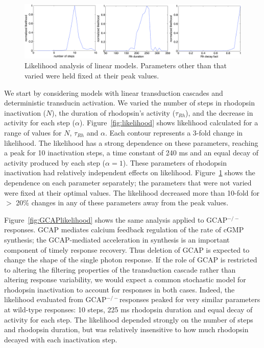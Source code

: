 \documentclass[12pt]{article}
\def\GCAPKO{GCAP$^{-/-}$}
\begin{document}
\begin{figure}[h]
\begin{center}
\includegraphics[width=6in]{likelihoodcuts.pdf}
\caption{Likelihood analysis of linear models.  Parameters other than that varied were held fixed at their peak values.}
\label{fig:likelihoodcuts}
\end{center}
\end{figure}

We start by considering models with linear transduction cascades and deterministic transducin activation.  We varied the number of steps in rhodopsin inactivation ($N$), the duration of rhodopsin's activity ($\tau_{Rh}$), and the decrease in activity for each step ($\alpha$).  Figure~\ref{fig:likelihood} shows likelihood calculated for a range of values for $N$, $\tau_{Rh}$ and $\alpha$.  Each contour represents a 3-fold change in likelihood.  The likelihood has a strong dependence on these parameters, reaching a peak for 10 inactivation steps, a time constant of 240 ms and an equal decay of activity produced by each step ($\alpha = 1$).  These parameters of rhodopsin inactivation had relatively independent effects on likelihood.  Figure~\ref{fig:likelihoodcuts} shows the dependence on each parameter separately; the parameters that were not varied were fixed at their optimal values.  The likelihood decreased more than 10-fold for $>$ 20\% changes in any of these parameters away from the peak values.

Figure~\ref{fig:GCAPlikelihood} shows the same analysis applied to \GCAPKO responses.  GCAP mediates calcium feedback regulation of the rate of cGMP synthesis; the GCAP-mediated acceleration in synthesis is an important component of timely response recovery.  Thus deletion of GCAP is expected to change the shape of the single photon response.  If the role of GCAP is restricted to altering the filtering properties of the transduction cascade rather than altering response variability, we would expect a common stochastic model for rhodopsin inactivation to account for responses in both cases.  Indeed, the likelihood evaluated from \GCAPKO responses peaked for very similar parameters at wild-type responses: 10 steps, 225 ms rhodopsin duration and equal decay of activity for each step.  The likelihood depended strongly on the number of steps and rhodopsin duration, but was relatively insensitive to how much rhodopsin decayed with each inactivation step. 
\end{document}
